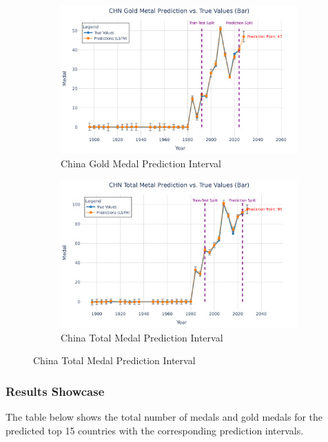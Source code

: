 \documentclass{mcmthesis}
\begin{document}
\begin{figure}[H]
	\label{fig:chn_usa_pred}
		\begin{subfigure}[b]{0.48\textwidth}
		\includegraphics[width=\textwidth]{fig/CHN Gold Metal Prediction vs. True Values (Bar).png}
		\caption{China Gold Medal Prediction Interval}
		\label{fig:chn_gold}
	\end{subfigure}
	\hfill
	\begin{subfigure}[b]{0.48\textwidth}
		\includegraphics[width=\textwidth]{fig/CHN Total Metal Prediction vs. True Values (Bar).png}
		\caption{China Total Medal Prediction Interval}
		\label{fig:chn_total}
	\end{subfigure}
	
\end{figure}
\subsubsection{Results Showcase}
The table below shows the total number of medals and gold medals for the predicted top 15 countries with the corresponding prediction intervals.
\end{document}
